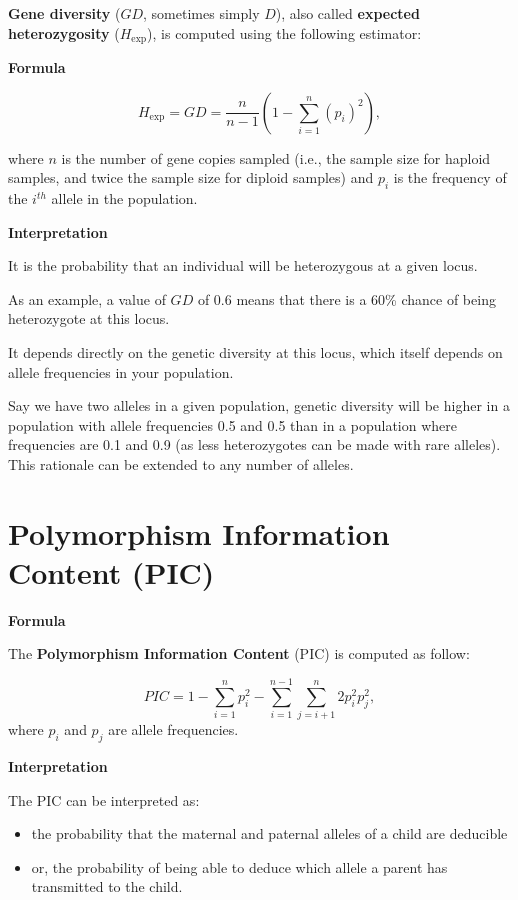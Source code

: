 \documentclass[
]{book}
\begin{document}
\textbf{Gene diversity} (\(GD\), sometimes simply \(D\)), also called \textbf{expected heterozygosity}
(\(H_{\mathrm{exp}}\)), is computed using the following estimator:

\textbf{Formula}

\[
  H_{\mathrm{exp}} = GD = \frac{n}{n - 1} \left( 1 - \sum_{i=1}^{n}(p_i)^2 \right),
\]

where \(n\) is the number of gene copies sampled (i.e., the sample size for haploid samples, and twice the sample size for diploid samples) and \(p_i\) is the
frequency of the \(i^{th}\) allele in the population.

\textbf{Interpretation}

It is the probability that an individual will be heterozygous at a given locus.

As an example, a value of \(GD\) of 0.6 means that there is a 60\% chance of being
heterozygote at this locus.

It depends directly on the genetic diversity at this locus, which itself depends on
allele frequencies in your population.

Say we have two alleles in a given population, genetic diversity will be higher
in a population with allele frequencies 0.5 and 0.5 than in a population where
frequencies are 0.1 and 0.9 (as less heterozygotes can be made with rare
alleles). This rationale can be extended to any number of alleles.

\hypertarget{polymorphism-information-content-pic}{%
\section{Polymorphism Information Content (PIC)}\label{polymorphism-information-content-pic}}

\textbf{Formula}

The \textbf{Polymorphism Information Content} (PIC) is computed as follow:

\[
PIC = 1 - \sum_{i=1}^{n} p_i^2 - \sum_{i=1}^{n-1} \sum_{j=i+1}^{n} 2p_i^2p_j^2,
\]
where \(p_i\) and \(p_j\) are allele frequencies.

\textbf{Interpretation}

The PIC can be interpreted as:

\begin{itemize}
\item
  the probability that the maternal and paternal alleles of a child are
  deducible
\item
  or, the probability of being able to deduce which allele a
  parent has transmitted to the child.
\end{itemize}
\end{document}
